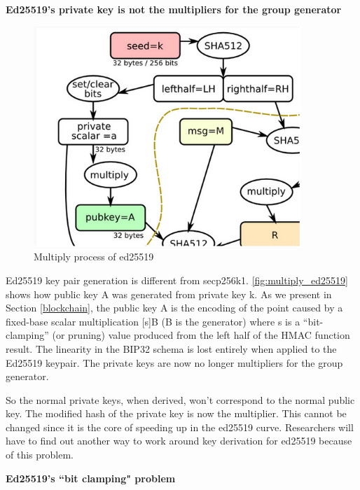 \begin{adjustwidth}{1cm}{}
    \bigskip
    {\textbf{Ed25519's private key is not the multipliers for the group generator}}

    \bigskip
    \begin{figure}[ht!]
        \centering
        \includegraphics[width=0.9\textwidth]{images/ed25519_generator_multiplier.png}
        \caption[Multiply process of ed25519]{Multiply process of ed25519 \cite{learnme}}
        \label{fig:multiply_ed25519}
    \end{figure}

    Ed25519 key pair generation is different from secp256k1. \autoref{fig:multiply_ed25519} shows how public key A was generated from private key k. As we present in Section \ref{blockchain}, the public key A is the encoding of the point caused by a fixed-base scalar multiplication [s]B (B is the generator) where s is a “bit-clamping” (or pruning) value produced from the left half of the HMAC function result. The linearity in the BIP32 schema is lost entirely when applied to the Ed25519 keypair. The private keys are now no longer multipliers for the group generator.

    So the normal private keys, when derived, won’t correspond to the normal public key. The modified hash of the private key is now the multiplier. This cannot be changed since it is the core of speeding up in the ed25519 curve. Researchers will have to find out another way to work around key derivation for ed25519 because of this problem.

    \bigskip
    {\textbf{Ed25519's “bit clamping" problem}}


\end{adjustwidth}

